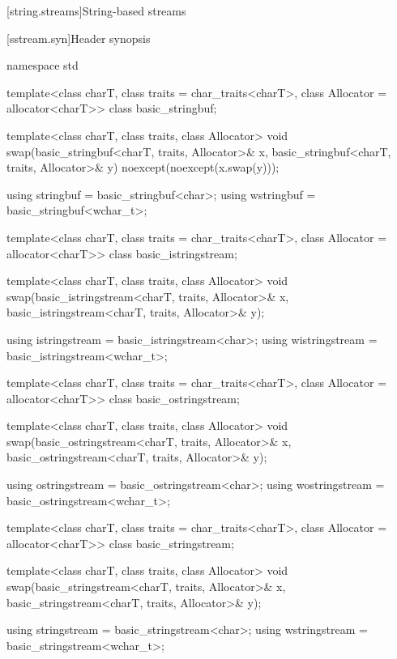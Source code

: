 [string.streams]{String-based streams}

[sstream.syn]{Header  synopsis}

%
%
%
%
%
%
%
%
%
%
%
%
%
%
%
%
%
\begin{codeblock}
namespace std {
  template<class charT, class traits = char_traits<charT>,
           class Allocator = allocator<charT>>
    class basic_stringbuf;

  template<class charT, class traits, class Allocator>
    void swap(basic_stringbuf<charT, traits, Allocator>& x,
              basic_stringbuf<charT, traits, Allocator>& y) noexcept(noexcept(x.swap(y)));

  using stringbuf  = basic_stringbuf<char>;
  using wstringbuf = basic_stringbuf<wchar_t>;

  template<class charT, class traits = char_traits<charT>,
           class Allocator = allocator<charT>>
    class basic_istringstream;

  template<class charT, class traits, class Allocator>
    void swap(basic_istringstream<charT, traits, Allocator>& x,
              basic_istringstream<charT, traits, Allocator>& y);

  using istringstream  = basic_istringstream<char>;
  using wistringstream = basic_istringstream<wchar_t>;

  template<class charT, class traits = char_traits<charT>,
           class Allocator = allocator<charT>>
    class basic_ostringstream;

  template<class charT, class traits, class Allocator>
    void swap(basic_ostringstream<charT, traits, Allocator>& x,
              basic_ostringstream<charT, traits, Allocator>& y);

  using ostringstream  = basic_ostringstream<char>;
  using wostringstream = basic_ostringstream<wchar_t>;

  template<class charT, class traits = char_traits<charT>,
           class Allocator = allocator<charT>>
    class basic_stringstream;

  template<class charT, class traits, class Allocator>
    void swap(basic_stringstream<charT, traits, Allocator>& x,
              basic_stringstream<charT, traits, Allocator>& y);

  using stringstream  = basic_stringstream<char>;
  using wstringstream = basic_stringstream<wchar_t>;
}
\end{codeblock}


